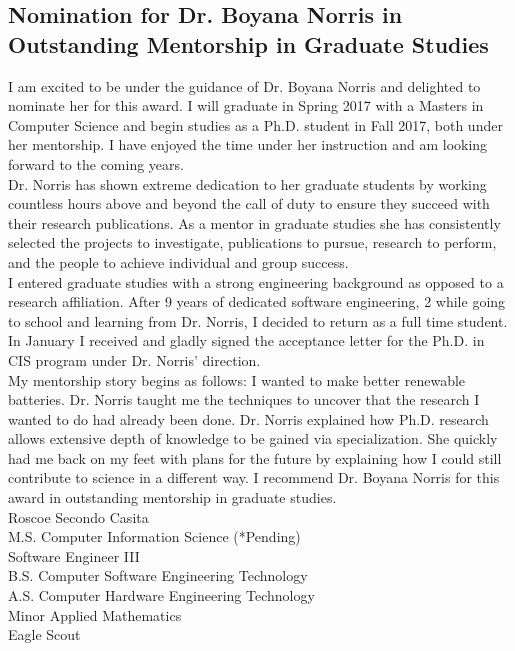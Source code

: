 \documentclass[12pt]{article}
\begin{document}
\begin{center}
\section*{Nomination for Dr. Boyana Norris in Outstanding Mentorship in Graduate Studies\\}	
\end{center}

I am excited to be under the guidance of Dr. Boyana Norris and delighted to nominate her for this award. I will graduate in Spring 2017 with a Masters in Computer Science and begin studies as a Ph.D. student in Fall 2017, both under her mentorship. I have enjoyed the time under her instruction and am looking forward to the coming years.\\

Dr. Norris has shown extreme dedication to her graduate students by working countless hours above and beyond the call of duty to ensure they succeed with their research publications. As a mentor in graduate studies she has consistently selected the projects to investigate, publications to pursue, research to perform, and the people to achieve individual and group success.\\

I entered graduate studies with a strong engineering background as opposed to a research affiliation. After 9 years of dedicated software engineering, 2 while going to school and learning from Dr. Norris, I decided to return as a full time student. In January I received and gladly signed the acceptance letter for the Ph.D. in CIS program under Dr. Norris' direction.\\

My mentorship story begins as follows: I wanted to make better renewable batteries. Dr. Norris taught me the techniques to uncover that the research I wanted to do had already been done. Dr. Norris explained how Ph.D. research allows extensive depth of knowledge to be gained via specialization. She quickly had me back on my feet with plans for the future by explaining how I could still contribute to science in a different way. I recommend Dr. Boyana Norris for this award in outstanding mentorship in graduate studies.\\



\noindent
Roscoe Secondo Casita\\
M.S. Computer Information Science (*Pending)\\
Software Engineer III\\
B.S. Computer Software Engineering Technology\\
A.S. Computer Hardware Engineering Technology\\
Minor Applied Mathematics\\
Eagle Scout\\
\end{document}
